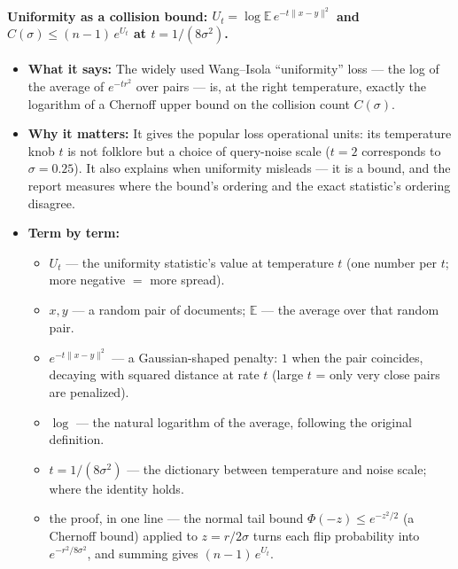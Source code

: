\documentclass[11pt,letterpaper]{article}
\newcommand{\E}{\mathbb{E}}
\begin{document}
\paragraph{Uniformity as a collision bound: $U_t = \log \E\, e^{-t \lVert x
- y \rVert^2}$ and $C(\sigma) \le (n{-}1)\, e^{U_t}$ at $t = 1/(8
\sigma^2)$.}
\begin{itemize}
  \item \textbf{What it says:} The widely used Wang--Isola ``uniformity''
  loss --- the log of the average of $e^{-t r^2}$ over pairs --- is, at the
  right temperature, exactly the logarithm of a Chernoff upper bound on the
  collision count $C(\sigma)$.
  \item \textbf{Why it matters:} It gives the popular loss operational
  units: its temperature knob $t$ is not folklore but a choice of
  query-noise scale ($t = 2$ corresponds to $\sigma = 0.25$). It also
  explains when uniformity misleads --- it is a bound, and the report
  measures where the bound's ordering and the exact statistic's ordering
  disagree.
  \item \textbf{Term by term:}
  \begin{itemize}
        \item $U_t$ --- the uniformity statistic's value at temperature $t$
    (one number per $t$; more negative $=$ more spread).
    \item $x, y$ --- a random pair of documents; $\E$ --- the average over
    that random pair.
    \item $e^{-t \lVert x-y \rVert^2}$ --- a Gaussian-shaped penalty: $1$
    when the pair coincides, decaying with squared distance at rate $t$
    (large $t$ = only very close pairs are penalized).
    \item $\log$ --- the natural logarithm of the average, following the
    original definition.
    \item $t = 1/(8\sigma^2)$ --- the dictionary between temperature and
    noise scale; where the identity holds.
    \item the proof, in one line --- the normal tail bound $\Phi(-z) \le
    e^{-z^2/2}$ (a Chernoff bound) applied to $z = r/2\sigma$ turns each
    flip probability into $e^{-r^2/8\sigma^2}$, and summing gives
    $(n{-}1)\, e^{U_t}$.
  \end{itemize}
\end{itemize}
\end{document}
